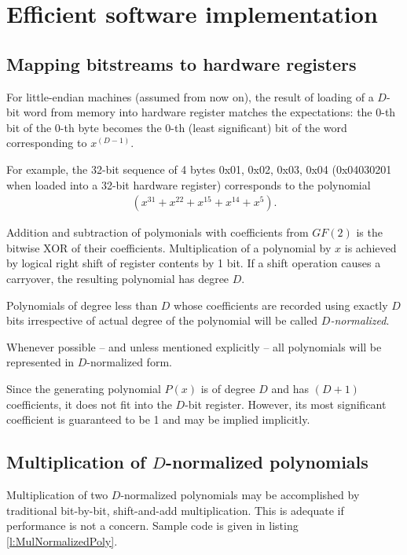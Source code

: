 \documentclass{article}
\begin{document}
\section{Efficient software implementation}

\subsection{Mapping bitstreams to hardware registers}

For little-endian machines (assumed from now on), the result of loading of
a $D$-bit word from memory into hardware register matches the expectations:
the 0-th bit of the 0-th byte becomes the 0-th (least significant) bit of
the word corresponding to $x^{(D-1)}$.

For example, the 32-bit sequence of 4 bytes 0x01, 0x02, 0x03, 0x04
(0x04030201 when loaded into a 32-bit hardware register) corresponds to the
polynomial
  \begin{align*}
    \left(x^{31} + x^{22} + x^{15} + x^{14} + x^{5}\right).
  \end{align*}

Addition and subtraction of polymonials with coefficients from $GF(2)$ is
the bitwise XOR of their coefficients. Multiplication of a polynomial by
$x$ is achieved by logical right shift of register contents by 1 bit. If a
shift operation causes a carryover, the resulting polynomial has degree
$D$.

Polynomials of degree less than $D$ whose coefficients are recorded using
exactly $D$ bits irrespective of actual degree of the polynomial will be
called {\it $D$-normalized}.

Whenever possible -- and unless mentioned explicitly -- all polynomials
will be represented in $D$-normalized form.

Since the generating polynomial $P(x)$ is of degree $D$ and has $(D+1)$
coefficients, it does not fit into the $D$-bit register. However, its most
significant coefficient is guaranteed to be 1 and may be implied
implicitly.

\subsection{Multiplication of $D$-normalized polynomials} \label{s:shiftandadd}

Multiplication of two $D$-normalized polynomials may be accomplished by
traditional bit-by-bit, shift-and-add multiplication. This is adequate if
performance is not a concern. Sample code is given in listing
\ref{l:MulNormalizedPoly}.
\end{document}
